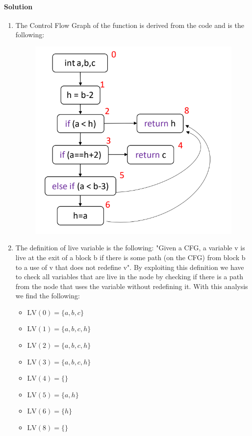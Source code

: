 \paragraph*{Solution}
\begin{enumerate}
    \item The Control Flow Graph of the function is derived from the code and is the following: 
        \begin{figure}[H]
            \centering
            \includegraphics[width=0.5\linewidth]{images/cfg.png}
        \end{figure}
    \item The definition of live variable is the following: "Given a CFG, a variable v is live at the exit of a block b if there is some path (on the CFG) from block b to a use of v that does not redefine v". 
        By exploiting this definition we have to check all variables that are live in the node by checking if there is a path from the node that uses the variable without redefining it. 
        With this analysis we find the following: 
        \begin{itemize}
            \item $\text{LV}(0) = \{a,b,c\}$
            \item $\text{LV}(1) = \{a,b,c,h\}$
            \item $\text{LV}(2) = \{a,b,c,h\}$
            \item $\text{LV}(3) = \{a,b,c,h\}$ 
            \item $\text{LV}(4) = \{ \}$ 
            \item $\text{LV}(5) = \{a,h\}$ 
            \item $\text{LV}(6) = \{h\}$ 
            \item $\text{LV}(8) = \{ \}$
        \end{itemize}
\end{enumerate}


















